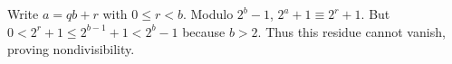 Write $a=qb+r$ with $0\le r<b$. Modulo $2^b-1$, $2^a+1\equiv2^r+1$. But $0<2^r+1\le2^{b-1}+1<2^b-1$ because $b>2$. Thus this residue cannot vanish, proving nondivisibility.
